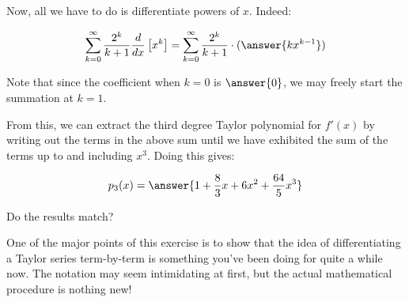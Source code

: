 \documentclass{ximera}
\begin{document}
\begin{exercise}
\begin{exercise}
Now, all we have to do is differentiate powers of $x$.  Indeed:

\[
\sum_{k=0}^{\infty}\frac{2^k}{k+1} \frac{d}{dx} \left[ x^k  \right] = \sum_{k=0}^{\infty} \frac{2^k}{k+1} \cdot(\answer{kx^{k-1}})
\]

Note that since the coefficient when $k=0$ is $\answer{0}$, we may freely start the summation at $k=1$.  

From this, we can extract the third degree Taylor polynomial for $f'(x)$ by writing out the terms in the above sum until we have exhibited the sum of the terms up to and including $x^3$.  Doing this gives:

\[
p_3(x) = \answer{1+\frac{8}{3}x+6x^2+\frac{64}{5}x^3}
\] 

Do the results match?

\begin{multipleChoice}
\end{multipleChoice}

One of the major points of this exercise is to show that the idea of differentiating a Taylor series term-by-term is something you've been doing for quite a while now.  The notation may seem intimidating at first, but the actual mathematical procedure is nothing new!

\end{exercise}
\end{exercise}
\end{document}

